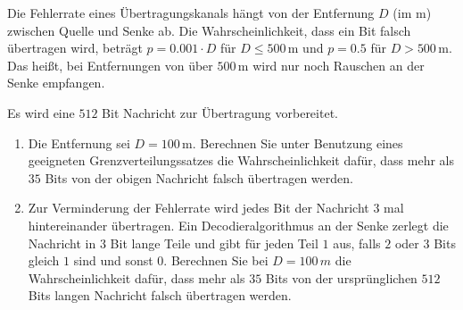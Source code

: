  Die Fehlerrate eines Übertragungskanals hängt
von der Entfernung $D$ (im m) zwischen Quelle und Senke ab. Die
Wahrscheinlichkeit, dass ein Bit falsch übertragen wird, beträgt $p =
0.001\cdot{} D$ für $D\leq 500\,\text{m}$ und $p=0.5$ für $D>500\,\text{m}$.
Das heißt, bei Entfernungen von über $500\,\text{m}$ wird nur noch Rauschen an
der Senke empfangen.

Es wird eine $512$ Bit Nachricht zur Übertragung vorbereitet.  
\begin{enumerate}
    \item Die Entfernung sei $D=100\,$m. Berechnen Sie unter Benutzung eines
        geeigneten Grenzverteilungssatzes die Wahrscheinlichkeit dafür, dass
        mehr als $35$ Bits von der obigen Nachricht falsch übertragen werden. 

    \item Zur Verminderung der Fehlerrate wird jedes Bit der Nachricht $3$ mal
        hintereinander übertragen. Ein Decodieralgorithmus an der Senke zerlegt
        die Nachricht in $3$ Bit lange Teile und gibt für jeden Teil $1$ aus,
        falls $2$ oder $3$ Bits gleich $1$ sind und sonst $0$. Berechnen Sie
        bei $D=100\,m$ die Wahrscheinlichkeit dafür, dass mehr als $35$ Bits
        von der ursprünglichen $512$ Bits langen Nachricht falsch übertragen
        werden.

\end{enumerate}

